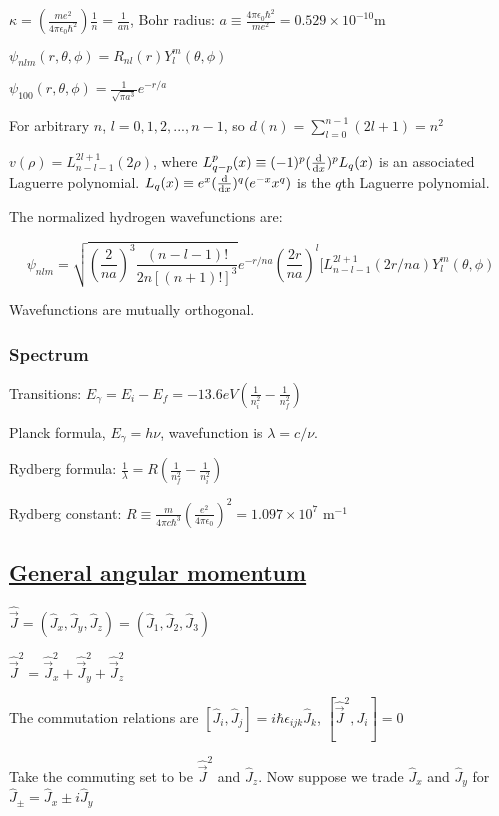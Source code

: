 $\kappa = (\frac{me^2}{4 \pi \epsilon_0 \hbar^2}) \frac{1}{n} = \frac{1}{an}$, Bohr radius: $a \equiv \frac{4 \pi \epsilon_0 \hbar^2}{me^2} = 0.529 \times 10^{-10} \textrm{m}$

$\psi_{nlm}(r, \theta, \phi) = R_{nl}(r) Y_l^m(\theta, \phi)$

$\psi_{100}(r, \theta, \phi) = \frac{1}{\sqrt{\pi a^3}} e^{-r/a}$

For arbitrary $n$, $l = 0, 1, 2, ..., n-1$, so $d(n) = \sum_{l=0}^{n-1} (2l+1) = n^2$

$v(\rho) = L_{n-l-1}^{2l+1} (2 \rho)$, where $L_{q-p}^p(x) \equiv (-1)^p (\dv{}{x})^p L_q (x)$ is an associated Laguerre polynomial. $L_q(x) \equiv e^x (\dv{}{x})^q (e^{-x} x^q)$ is the $q$th Laguerre polynomial.

The normalized hydrogen wavefunctions are:

$$\psi_{nlm} = \sqrt{(\frac{2}{na})^3 \frac{(n-l-1)!}{2n[(n+1)!]^3}} e^{-r/na} (\frac{2r}{na})^l [L_{n-l-1}^{2l+1} (2r/na) Y_l^m (\theta, \phi)$$

Wavefunctions are mutually orthogonal.

\subsubsection{Spectrum}

Transitions: $E_{\gamma} = E_i - E_f = -13.6 eV(\frac{1}{n_i^2} - \frac{1}{n_f^2})$

Planck formula, $E_{\gamma} = h \nu$, wavefunction is $\lambda = c / \nu$. 

Rydberg formula: $\frac{1}{\lambda} = R(\frac{1}{n^2_f} - \frac{1}{n^2_i})$

Rydberg constant: $R \equiv \frac{m}{4 \pi c \hbar^3} (\frac{e^2}{4 \pi \epsilon_0})^2 = 1.097 \times 10^7 \textrm{ m}^{-1}$

\subsection{\underline{General angular momentum}}
$\widehat{\vec{J}} = (\widehat{J}_x, \widehat{J}_y, \widehat{J}_z) = (\widehat{J}_1, \widehat{J}_2, \widehat{J}_3)$

$\widehat{\vec{J}}^2 = \widehat{\vec{J}}^2_x + \widehat{\vec{J}}^2_y + \widehat{\vec{J}}^2_z$

The commutation relations are $[\widehat{J}_i, \widehat{J}_j] = i \hbar \epsilon_{ijk} \widehat{J}_k$, $[\widehat{\vec{J}}^2, J_i] = 0$

Take the commuting set to be $\widehat{\vec{J}}^2$ and $\widehat{J}_z$. Now suppose we trade $\widehat{J}_x$ and $\widehat{J}_y$ for $\widehat{J}_{\pm} = \widehat{J}_x \pm i \widehat{J}_y$

